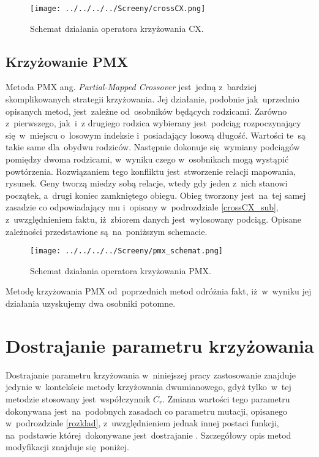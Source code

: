 \begin{figure}[h!]
\centering
		\texttt{[image: ../../../../Screeny/crossCX.png]}
		\caption{Schemat działania operatora krzyżowania CX.}
		\label{schematCX}			
\end{figure}


\subsection{Krzyżowanie PMX}\label{sec:kompilacja}

Metoda PMX ang. \textit{Partial-Mapped Crossover} jest~jedną z~bardziej skomplikowanych strategii krzyżowania. Jej działanie, podobnie jak~uprzednio opisanych metod, jest~zależne od~osobników będących rodzicami. Zarówno z~pierwszego, jak~i~z drugiego rodzica wybierany jest~podciąg rozpoczynający się~w~miejscu o~losowym indeksie i~posiadający losową długość. Wartości te~są takie same dla~obydwu rodziców. Następnie dokonuje się~wymiany podciągów pomiędzy dwoma rodzicami, w~wyniku czego w~osobnikach mogą wystąpić powtórzenia. Rozwiązaniem tego konfliktu jest~stworzenie relacji mapowania, rysunek. Geny tworzą miedzy sobą relacje, wtedy gdy jeden z~nich stanowi początek, a~drugi koniec zamkniętego obiegu. Obieg tworzony jest~na~tej samej zasadzie co odpowiadający mu i~opisany w~podrozdziale \ref{crossCX_sub}, z~uwzględnieniem faktu, iż~zbiorem danych jest~wylosowany podciąg. Opisane zależności przedstawione są~na~poniższym schemacie.

\begin{figure}[h!]
\centering
		\texttt{[image: ../../../../Screeny/pmx\_schemat.png]}
		\caption{Schemat działania operatora krzyżowania PMX.}
		\label{schematPMX}			
\end{figure}

Metodę krzyżowania PMX od~poprzednich metod odróżnia fakt, iż~w~wyniku jej działania uzyskujemy dwa osobniki potomne.

\section{Dostrajanie parametru krzyżowania}\label{dostrajaniecr}

Dostrajanie parametru krzyżowania w~niniejszej pracy zastosowanie znajduje jedynie w~kontekście metody krzyżowania dwumianowego, gdyż tylko~w~tej metodzie stosowany jest~współczynnik $C_{r}$. Zmiana wartości tego parametru dokonywana jest~na~podobnych zasadach co parametru mutacji, opisanego w~podrozdziale \ref{rozklad}, z~uwzględnieniem jednak innej postaci funkcji, na~podstawie której~dokonywane jest~dostrajanie \cite{doktorat}. Szczegółowy opis metod modyfikacji znajduje się~poniżej.

